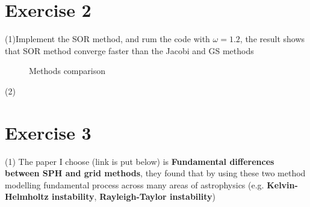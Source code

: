 \documentclass[aps,12pt,prd,nofootinbib,bibnotes, amsmath,amssymb,showpacs,superscriptaddress,floatfix]{revtex4-2}
\begin{document}
\section{Exercise 2}
(1)Implement the SOR method, and rum the code with $\omega = 1.2$, the result shows that SOR method converge faster than the Jacobi and GS methods
\begin{figure}[H]
\centering  
{}
\caption{Methods comparison}
\end{figure}

(2)
\section{Exercise 3}

(1) The paper I choose (link is put below) is {\bf{Fundamental differences between SPH and grid methods}}, they found that by using these two method modelling fundamental process across many areas of astrophysics (e.g. {\bf{Kelvin-Helmholtz instability}}, {\bf{Rayleigh-Taylor instability}})
\end{document}
